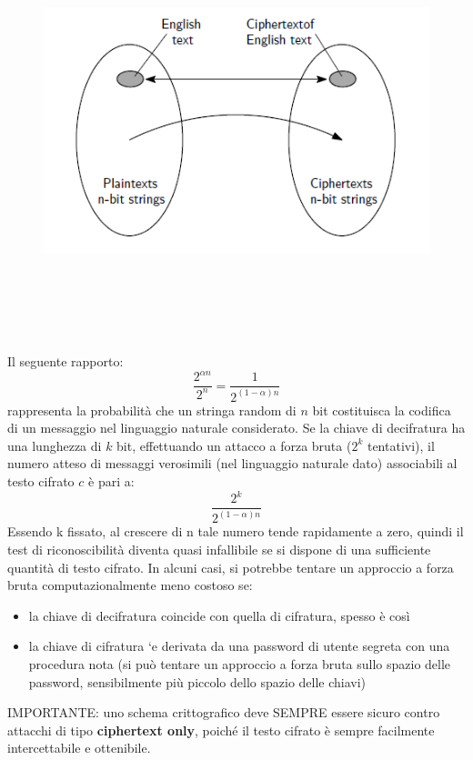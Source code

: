 \begin{figure}[htbp]
	\centering%
	\subfigure%
	{\includegraphics[height=12cm, width=12cm, keepaspectratio]{Immagini/Capitolo1/attacco_solo_tc.png}}
\end{figure}
\newline
Il seguente rapporto:
\begin{equation}
\frac{2^{\alpha n}}{2^n} = \frac{1}{2^{(1 - \alpha)n}}
\end{equation}
rappresenta la probabilità che un stringa random di $n$ bit costituisca la codifica di un messaggio nel linguaggio naturale considerato. Se la chiave di decifratura ha una lunghezza di $k$ bit, effettuando un attacco a forza bruta ($2^k$ tentativi), il numero atteso di messaggi verosimili (nel linguaggio naturale dato) associabili al testo cifrato $c$ è pari a:
\begin{equation}
\frac{2^k}{2^{(1 - \alpha)n}}
\end{equation}
Essendo k fissato, al crescere di n tale numero tende rapidamente a zero, quindi il test di riconoscibilità diventa quasi infallibile se si dispone di una sufficiente quantità di testo cifrato. In alcuni casi, si potrebbe tentare un approccio a forza bruta computazionalmente meno costoso se:
\begin{itemize} 
  \item la chiave di decifratura coincide con quella di cifratura, spesso è così
  \item la chiave di cifratura `e derivata da una password di utente segreta con una procedura nota (si può tentare un approccio a forza bruta sullo spazio delle password, sensibilmente più piccolo dello spazio delle chiavi)
\end{itemize}
IMPORTANTE: uno schema crittografico deve SEMPRE essere sicuro contro attacchi di tipo \textbf{ciphertext only}, poiché il testo cifrato è sempre facilmente intercettabile e ottenibile.

